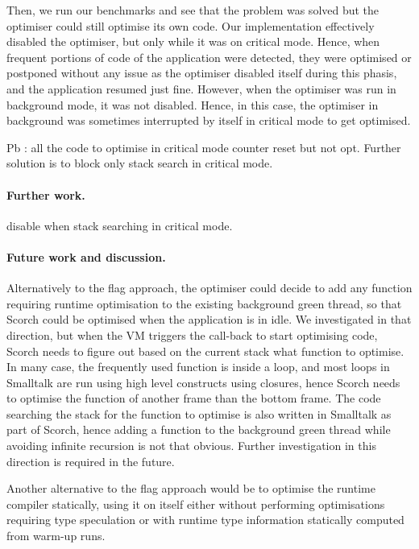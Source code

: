 \documentclass[a4paper,12pt,twoside]{../includes/ThesisStyle}
\begin{document}
Then, we run our benchmarks and see that the problem was solved but the optimiser could still optimise its own code. Our implementation effectively disabled the optimiser, but only while it was on critical mode. Hence, when frequent portions of code of the application were detected, they were optimised or postponed without any issue as the optimiser disabled itself during this phasis, and the application resumed just fine. However, when the optimiser was run in background mode, it was not disabled. Hence, in this case, the optimiser in background was sometimes interrupted by itself in critical mode to get optimised.






Pb : all the code to optimise in critical mode counter reset but not opt.
Further solution is to block only stack search in critical mode.




\paragraph{Further work.} disable when stack searching in critical mode.


\paragraph{Future work and discussion.} Alternatively to the flag approach, the optimiser could decide to add any function requiring runtime optimisation to the existing background green thread, so that Scorch could be optimised when the application is in idle. We investigated in that direction, but when the VM triggers the call-back to start optimising code, Scorch needs to figure out based on the current stack what function to optimise. In many case, the frequently used function is inside a loop, and most loops in Smalltalk are run using high level constructs using closures, hence Scorch needs to optimise the function of another frame than the bottom frame. The code searching the stack for the function to optimise is also written in Smalltalk as part of Scorch, hence adding a function to the background green thread while avoiding infinite recursion is not that obvious. Further investigation in this direction is required in the future.

Another alternative to the flag approach would be to optimise the runtime compiler statically, using it on itself either without performing optimisations requiring type speculation or with runtime type information statically computed from warm-up runs. 
\end{document}
